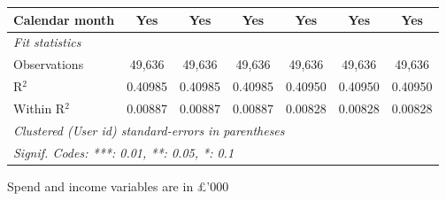 \begin{table}[htbp]
\begin{threeparttable}[b]
\begin{tabular}{lcccccc}
         Calendar month      & Yes            & Yes            & Yes            & Yes            & Yes            & Yes\\  
         \midrule
         \emph{Fit statistics}\\
         Observations        & 49,636         & 49,636         & 49,636         & 49,636         & 49,636         & 49,636\\  
         R$^2$               & 0.40985        & 0.40985        & 0.40985        & 0.40950        & 0.40950        & 0.40950\\  
         Within R$^2$        & 0.00887        & 0.00887        & 0.00887        & 0.00828        & 0.00828        & 0.00828\\  
         \midrule \midrule
         \multicolumn{7}{l}{\emph{Clustered (User id) standard-errors in parentheses}}\\
         \multicolumn{7}{l}{\emph{Signif. Codes: ***: 0.01, **: 0.05, *: 0.1}}\\
      \end{tabular}
      
      \begin{tablenotes}\footnotesize
         \item Spend and income variables are in \pounds'000
      \end{tablenotes}
   \end{threeparttable}
\end{table}


